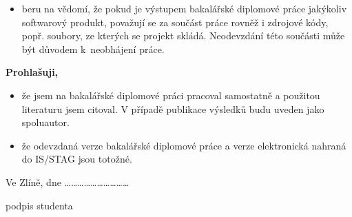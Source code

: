 {{\begin{itemize}
		\item{beru na vědomí, že pokud je výstupem \ifbp bakalářské \else \ifdp diplomové \fi \fi práce jakýkoliv softwarový produkt, považují se za součást práce rovněž i zdrojové kódy, popř. soubory, ze kterých se projekt skládá. Neodevzdání této součásti může být důvodem k~neobhájení práce.}
	\end{itemize}
	\medskip
	\textbf{Prohlašuji,}
	\begin{itemize}
		\setlength{\parskip}{0pt}
		\setlength{\itemsep}{0pt}
		\item{že jsem na \ifbp bakalářské \else \ifdp diplomové \fi \fi práci pracoval samostatně a použitou literaturu jsem citoval. V případě publikace výsledků budu uveden jako spoluautor.}
		\item{že odevzdaná verze \ifbp bakalářské \else \ifdp diplomové \fi \fi práce a verze elektronická nahraná do IS/STAG jsou totožné.}
	\end{itemize}
	\medskip
	Ve Zlíně, dne \hspace{6.5cm}\dots\dots\dots\dots\dots\dots\dots\dots\dots\dots
	
	\hspace{10.3cm}podpis studenta
	
}}
